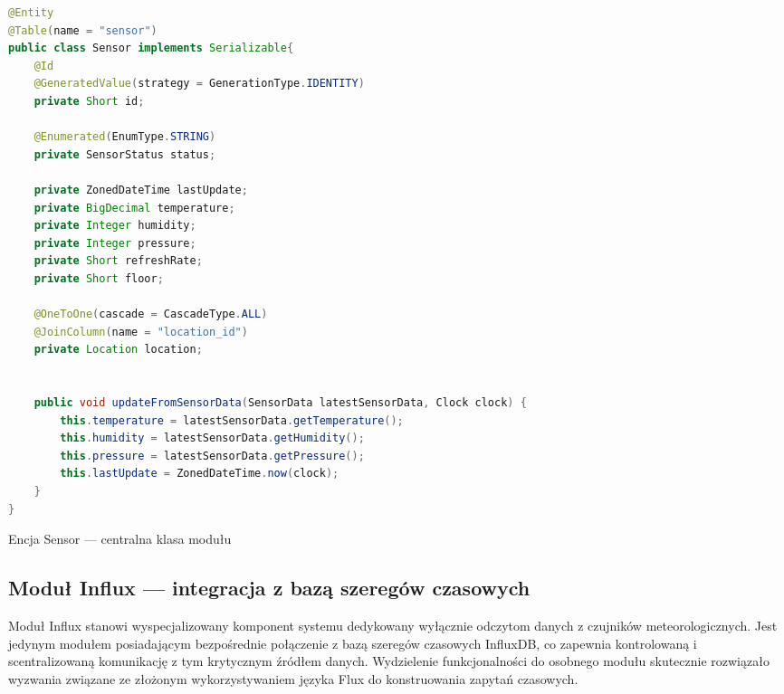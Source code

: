 \documentclass[a4paper,12pt,openany]{book}
\begin{document}
\begin{lstfloat}[H]
\begin{lstlisting}[language=java]
@Entity
@Table(name = "sensor")
public class Sensor implements Serializable{
    @Id
    @GeneratedValue(strategy = GenerationType.IDENTITY)
    private Short id;

    @Enumerated(EnumType.STRING)
    private SensorStatus status;

    private ZonedDateTime lastUpdate;
    private BigDecimal temperature;
    private Integer humidity;
    private Integer pressure;
    private Short refreshRate;
    private Short floor;

    @OneToOne(cascade = CascadeType.ALL)
    @JoinColumn(name = "location_id")
    private Location location;


    public void updateFromSensorData(SensorData latestSensorData, Clock clock) {
        this.temperature = latestSensorData.getTemperature();
        this.humidity = latestSensorData.getHumidity();
        this.pressure = latestSensorData.getPressure();
        this.lastUpdate = ZonedDateTime.now(clock);
    }
}
\end{lstlisting}
\caption{Encja Sensor --- centralna klasa modułu}
\label{lst:sensor-entity}
\end{lstfloat}


\subsection{Moduł Influx --- integracja z bazą szeregów czasowych}

Moduł Influx stanowi wyspecjalizowany komponent systemu dedykowany wyłącznie odczytom danych z czujników meteorologicznych. Jest jedynym modułem posiadającym bezpośrednie połączenie z bazą szeregów czasowych InfluxDB, co zapewnia kontrolowaną i scentralizowaną komunikację z tym krytycznym źródłem danych. Wydzielenie funkcjonalności do osobnego modułu skutecznie rozwiązało wyzwania związane ze złożonym wykorzystywaniem języka Flux do konstruowania zapytań czasowych.
\end{document}

